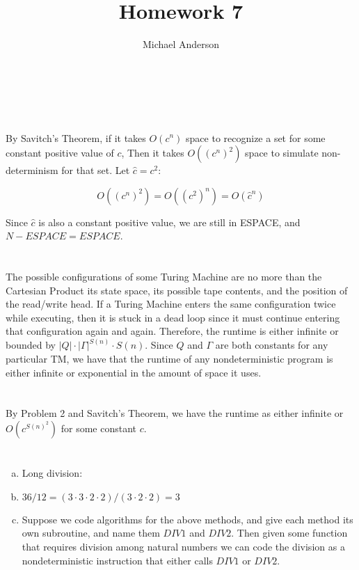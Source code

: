 \documentclass{article}
\author{Michael Anderson}
\title{Homework 7}
\begin{document}
\maketitle
{}
\\
\flushleft
\newpage

\section{}
By Savitch's Theorem, if it takes $O(c^n)$ space to recognize a set for
some constant positive value of $c$, Then it
takes $O((c^n)^2)$ space to simulate non-determinism for that set. Let
$\hat c = c^2$:

\[
O((c^n)^2) = O((c^2)^n) = O(\hat c^n)
\]

Since $\hat c$ is also a constant positive value, we are still in ESPACE, and
$N-ESPACE = ESPACE$.

\section{}
The possible configurations of some Turing Machine are no more than the
Cartesian Product its state space, its possible tape contents, and the position
of the read/write head. If a Turing
Machine enters the same configuration twice while executing, then it is stuck
in a dead loop
since it must continue entering that configuration again and again. Therefore,
the runtime is either infinite or bounded by $|Q| \cdot |\Gamma|^{S(n)} \cdot
S(n)$. Since
$Q$ and $\Gamma$ are both constants for any particular TM, we have that the
runtime of any nondeterministic program is either infinite or exponential in the
amount of space it uses.

\section{}
By Problem 2 and Savitch's Theorem, we have the runtime as either infinite or
$O(c^{S(n)^2})$ for some constant $c$.

\section{}
\begin{enumerate}[a)]
\item
Long division:\\ \vspace{6pt} \hspace{1em}
\item
$36/12 = (3 \cdot 3 \cdot 2 \cdot 2)/(3 \cdot 2 \cdot 2) = 3$
\item
Suppose we code algorithms for the above methods, and give each method its own
subroutine, and name them $DIV1$ and $DIV2$. Then given some function that
requires 
division among natural numbers we can code the division as a nondeterministic
instruction that either calls $DIV1$ or $DIV2$.

\end{enumerate}
\end{document}
